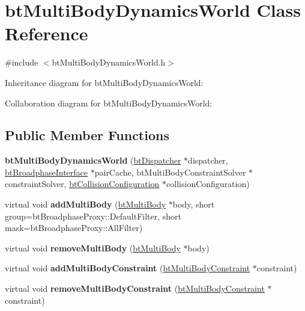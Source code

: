 \hypertarget{classbt_multi_body_dynamics_world}{\section{bt\+Multi\+Body\+Dynamics\+World Class Reference}
\label{classbt_multi_body_dynamics_world}
}


{\ttfamily \#include $<$bt\+Multi\+Body\+Dynamics\+World.\+h$>$}



Inheritance diagram for bt\+Multi\+Body\+Dynamics\+World\+:


Collaboration diagram for bt\+Multi\+Body\+Dynamics\+World\+:
\subsection*{Public Member Functions}
\begin{DoxyCompactItemize}
\item 
\hypertarget{classbt_multi_body_dynamics_world_ada48332bbd9b86f7bbcbf1454972b136}{{\bfseries bt\+Multi\+Body\+Dynamics\+World} (\hyperlink{classbt_dispatcher}{bt\+Dispatcher} $\ast$dispatcher, \hyperlink{classbt_broadphase_interface}{bt\+Broadphase\+Interface} $\ast$pair\+Cache, bt\+Multi\+Body\+Constraint\+Solver $\ast$constraint\+Solver, \hyperlink{classbt_collision_configuration}{bt\+Collision\+Configuration} $\ast$collision\+Configuration)}\label{classbt_multi_body_dynamics_world_ada48332bbd9b86f7bbcbf1454972b136}

\item 
\hypertarget{classbt_multi_body_dynamics_world_a8ccc168e654b5eae670660a1c89698e6}{virtual void {\bfseries add\+Multi\+Body} (\hyperlink{classbt_multi_body}{bt\+Multi\+Body} $\ast$body, short group=bt\+Broadphase\+Proxy\+::\+Default\+Filter, short mask=bt\+Broadphase\+Proxy\+::\+All\+Filter)}\label{classbt_multi_body_dynamics_world_a8ccc168e654b5eae670660a1c89698e6}

\item 
\hypertarget{classbt_multi_body_dynamics_world_ad66a6a1eeef7775c2eb01e76dd739428}{virtual void {\bfseries remove\+Multi\+Body} (\hyperlink{classbt_multi_body}{bt\+Multi\+Body} $\ast$body)}\label{classbt_multi_body_dynamics_world_ad66a6a1eeef7775c2eb01e76dd739428}

\item 
\hypertarget{classbt_multi_body_dynamics_world_a5a066da00459c6376bccfa2eccf05bdd}{virtual void {\bfseries add\+Multi\+Body\+Constraint} (\hyperlink{classbt_multi_body_constraint}{bt\+Multi\+Body\+Constraint} $\ast$constraint)}\label{classbt_multi_body_dynamics_world_a5a066da00459c6376bccfa2eccf05bdd}

\item 
\hypertarget{classbt_multi_body_dynamics_world_a65df7891840746799c48b1fab45192c4}{virtual void {\bfseries remove\+Multi\+Body\+Constraint} (\hyperlink{classbt_multi_body_constraint}{bt\+Multi\+Body\+Constraint} $\ast$constraint)}\label{classbt_multi_body_dynamics_world_a65df7891840746799c48b1fab45192c4}

\end{DoxyCompactItemize}
